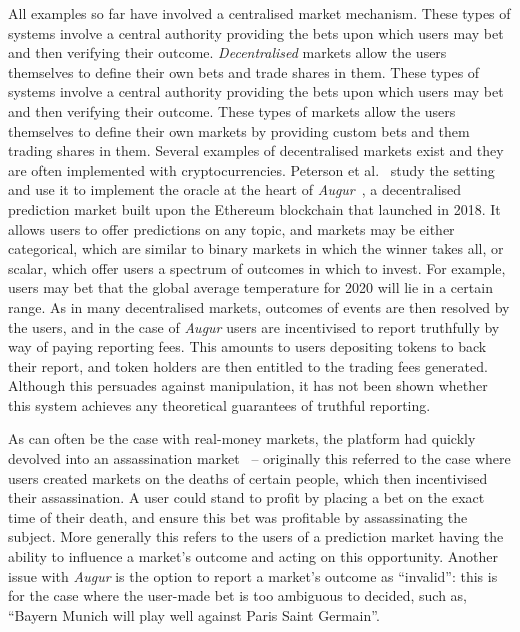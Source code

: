All examples so far have involved a centralised market mechanism. These types
of systems involve a central authority providing the bets upon which users may
bet and then verifying their outcome. \emph{Decentralised} markets allow the
users themselves to define their own bets and trade shares in them. These types
of systems involve a central authority providing the bets upon which users may
bet and then verifying their outcome. These types of markets allow the users
themselves to define their own markets by providing custom bets and them
trading shares in them. Several examples of decentralised markets exist and
they are often implemented with cryptocurrencies. Peterson et
al.~\cite{Peterson2015} study the setting and use it to implement the oracle at
the heart of \emph{Augur}~\cite{Augur}, a decentralised prediction market built
upon the Ethereum blockchain that launched in 2018. It allows users to offer
predictions on any topic, and markets may be either categorical, which are
similar to binary markets in which the winner takes all, or scalar, which offer
users a spectrum of outcomes in which to invest. For example, users may bet
that the global average temperature for 2020 will lie in a certain range.  As
in many decentralised markets, outcomes of events are then resolved by the
users, and in the case of \emph{Augur} users are incentivised to report
truthfully by way of paying reporting fees. This amounts to users depositing
tokens to back their report, and token holders are then entitled to the trading
fees generated. Although this persuades against manipulation, it has not been
shown whether this system achieves any theoretical guarantees of truthful
reporting.

As can often be the case with real-money markets, the platform had quickly
devolved into an assassination market~\cite{AugurDeathMarket} -- originally
this referred to the case where users created markets on the deaths of certain
people, which then incentivised their assassination. A user could stand to
profit by placing a bet on the exact time of their death, and ensure this bet
was profitable by assassinating the subject. More generally this refers to the
users of a prediction market having the ability to influence a market's outcome
and acting on this opportunity. Another issue with \emph{Augur} is the option
to report a market's outcome as ``invalid'': this is for the case where the
user-made bet is too ambiguous to decided, such as, ``Bayern Munich will play
well against Paris Saint Germain''.

